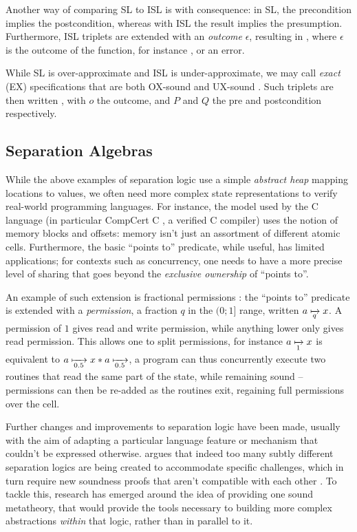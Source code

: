 Another way of comparing SL to ISL is with consequence: in SL, the precondition implies the postcondition, whereas with ISL the result implies the presumption. Furthermore, ISL triplets are extended with an \emph{outcome} $\epsilon$, resulting in , where $\epsilon$ is the outcome of the function, for instance \Ok, or an error.

While SL is over-approximate and ISL is under-approximate, we may call \emph{exact} (EX) specifications that are both OX-sound and UX-sound \cite{exactsl}. Such triplets are then written , with $o$ the outcome, and $P$ and $Q$ the pre and postcondition respectively.

\subsection{Separation Algebras}
\label{subsec:separation-algebras}

While the above examples of separation logic use a simple \emph{abstract heap} mapping locations to values, we often need more complex state representations to verify real-world programming languages. For instance, the model used by the C language (in particular CompCert C \cite{compcert}, a verified C compiler) uses the notion of memory blocks and offsets: memory isn't just an assortment of different atomic cells. Furthermore, the basic ``points to'' predicate, while useful, has limited applications; for contexts such as concurrency, one needs to have a more precise level of sharing that goes beyond the \emph{exclusive ownership} of ``points to''.

An example of such extension is fractional permissions \cite{fracpermissions, fracpermissions2}: the ``points to'' predicate is extended with a \emph{permission}, a fraction $q$ in the $(0;1]$ range, written $a \mapstoq{q} x$. A permission of $1$ gives read and write permission, while anything lower only gives read permission. This allows one to split permissions, for instance $a \mapstoq{1} x$ is equivalent to $a\mapstoq{0.5}x * a\mapstoq{0.5}$, a program can thus concurrently execute two routines that read the same part of the state, while remaining sound -- permissions can then be re-added as the routines exit, regaining full permissions over the cell.

Further changes and improvements to separation logic have been made, usually with the aim of adapting a particular language feature or mechanism that couldn't be expressed otherwise.  \cite{next700seplogics} argues that indeed too many subtly different separation logics are being created to accommodate specific challenges, which in turn require new soundness proofs that aren't compatible with each other \cite{sljungle}. To tackle this, research has emerged around the idea of providing one sound metatheory, that would provide the tools necessary to building more complex abstractions \emph{within} that logic, rather than in parallel to it.


